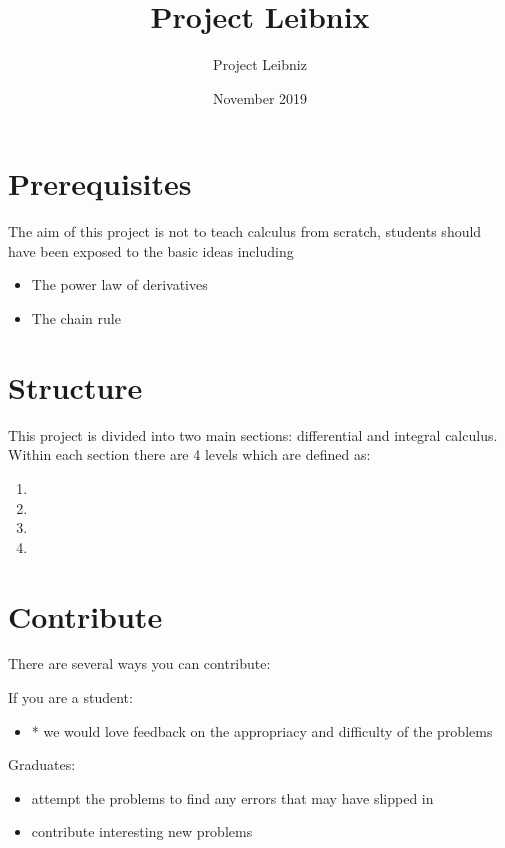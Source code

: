 \documentclass{article}
\title{Project Leibnix}
\author{Project Leibniz}
\date{November 2019}
\begin{document}


\section{Prerequisites}

The aim of this project is not to teach calculus from scratch, students should
have been exposed to the basic ideas including

\begin{itemize}
	\item The power law of derivatives
	\item The chain rule
\end{itemize}

\section{Structure}

This project is divided into two main sections: differential and integral calculus. Within each section there are 4 levels which are defined as:

\begin{enumerate}
	\item 
	\item 
	\item 
	\item 
\end{enumerate}

\section{Contribute}

There are several ways you can contribute:

If you are a student:
\begin{itemize}
	\item * we would love feedback on the appropriacy and difficulty of the problems
\end{itemize}

Graduates:
\begin{itemize}
	\item attempt the problems to find any errors that may have slipped in
	\item contribute interesting new problems
\end{itemize}
\end{document}
